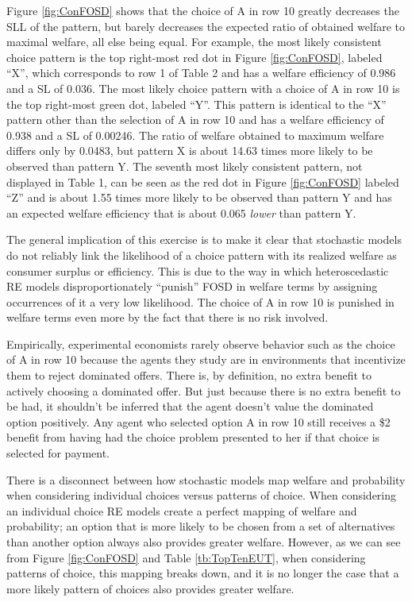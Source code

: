 \documentclass[../main.tex]{subfiles}
\begin{document}
Figure \ref{fig:ConFOSD} shows that the choice of A in row 10 greatly decreases the SLL of the pattern, but barely decreases the expected ratio of obtained welfare to maximal welfare, all else being equal.
For example, the most likely consistent choice pattern is the top right-most red dot in Figure \ref{fig:ConFOSD}, labeled \enquote{X}, which corresponds to row 1 of Table 2 and has a welfare efficiency of 0.986 and a SL of 0.036.
The most likely choice pattern with a choice of A in row 10 is the top right-most green dot, labeled \enquote{Y}.
This pattern is identical to the \enquote{X} pattern other than the selection of A in row 10 and has a welfare efficiency of 0.938 and a SL of 0.00246.
The ratio of welfare obtained to maximum welfare differs only by 0.0483, but pattern X is about 14.63 times more likely to be observed than pattern Y.{\footnotemark}
The seventh most likely consistent pattern, not displayed in Table 1, can be seen as the red dot in Figure \ref{fig:ConFOSD} labeled \enquote{Z} and is about 1.55 times more likely to be observed than pattern Y and has an expected welfare efficiency that is about 0.065 \textit{lower} than pattern Y.

\addtocounter{footnote}{-1}

The general implication of this exercise is to make it clear that stochastic models do not reliably link the likelihood of a choice pattern with its realized welfare as consumer surplus or efficiency.
This is due to the way in which heteroscedastic RE models disproportionately \enquote{punish} FOSD in welfare terms by assigning occurrences of it a very low likelihood.
The choice of A in row 10 is punished in welfare terms even more by the fact that there is no risk involved.

Empirically, experimental economists rarely observe behavior such as the choice of A in row 10 because the agents they study are in environments that incentivize them to reject dominated offers.
There is, by definition, no extra benefit to actively choosing a dominated offer.
But just because there is no extra benefit to be had, it shouldn't be inferred that the agent doesn't value the dominated option positively.
Any agent who selected option A in row 10 still receives a \$2 benefit from having had the choice problem presented to her if that choice is selected for payment.

There is a disconnect between how stochastic models map welfare and probability when considering individual choices versus patterns of choice.
When considering an individual choice RE models create a perfect mapping of welfare and probability; an option that is more likely to be chosen from a set of alternatives than another option always also provides greater welfare.
However, as we can see from Figure \ref{fig:ConFOSD} and Table \ref{tb:TopTenEUT}, when considering patterns of choice, this mapping breaks down, and it is no longer the case that a more likely pattern of choices also provides greater welfare.
\end{document}
